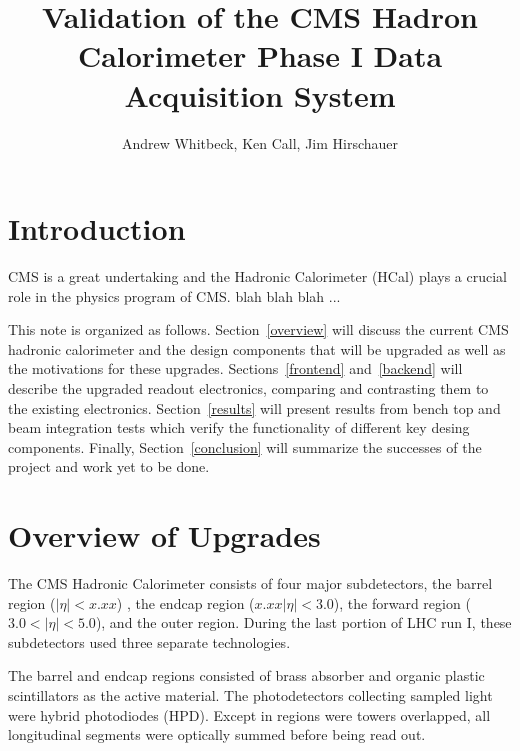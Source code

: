 \documentclass[11pt]{article} %
\title{Validation of the CMS Hadron Calorimeter Phase I Data Acquisition System}
\author{Andrew Whitbeck, Ken Call, Jim Hirschauer}
\begin{document}
\maketitle


\section{Introduction}

CMS is a great undertaking and the Hadronic Calorimeter (HCal) plays a crucial role in the physics program
of CMS.  blah blah blah ...

This note is organized as follows.  Section~\ref{overview} will discuss the current CMS hadronic calorimeter 
and the design components that will be upgraded as well as the motivations for these upgrades.   
Sections~\ref{frontend} and~\ref{backend} will describe the upgraded readout electronics, comparing and
contrasting them to the existing electronics.  Section~\ref{results} will present results from bench top and beam 
integration tests which verify the functionality of different key desing components.  Finally, Section~\ref{conclusion}
will summarize the successes of the project and work yet to be done. 

\section{Overview of Upgrades}

The CMS Hadronic Calorimeter consists of four major subdetectors, the barrel region ($|\eta|<x.xx$) , 
the endcap region ($x.xx|\eta|<3.0$), the forward region ($3.0<|\eta|<5.0$), and the outer region.   
During the last portion of LHC run I, these subdetectors used three separate technologies.  

The barrel and endcap regions consisted of brass absorber and organic plastic scintillators as the active 
material.  The photodetectors collecting sampled light were hybrid photodiodes (HPD).  
Except in regions were towers overlapped, 
all longitudinal segments were optically summed before being read out.  
\end{document}
